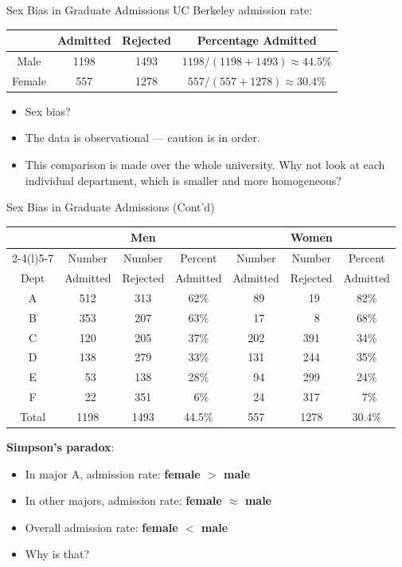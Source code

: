 \documentclass[
  ignorenonframetext,
]{beamer}
\providecommand{\tightlist}{%
  \setlength{\itemsep}{0pt}\setlength{\parskip}{0pt}}
\begin{document}
\begin{frame}{Sex Bias in Graduate Admissions}
\protect\hypertarget{sex-bias-in-graduate-admissions}{}
UC Berkeley admission rate:

\begin{center}
\begin{tabular}{@{}cccc@{}}
& Admitted & Rejected & Percentage Admitted\\\hline
Male   & 1198 & 1493 & $1198/(1198+1493)\approx44.5\%$ \\
Female &  557 & 1278 & $557/(557+1278)\approx30.4\%$\\\hline
\end{tabular}
\end{center}

\begin{itemize}
\tightlist
\item
  Sex bias?
\item
  The data is observational --- caution is in order.
\item
  This comparison is made over the whole university. Why not look at
  each individual department, which is smaller and more homogeneous?
\end{itemize}
\end{frame}

\begin{frame}{Sex Bias in Graduate Admissions (Cont'd)}
\protect\hypertarget{sex-bias-in-graduate-admissions-contd}{}
\begin{center}\small\tabcolsep=3pt
\begin{tabular}{@{}ccccccc@{}}
  & \multicolumn{3}{c}{Men} & \multicolumn{3}{c}{Women} \\\cmidrule(r){2-4}\cmidrule(l){5-7 }
  & Number & Number & Percent & Number & Number & Percent\\
Dept & Admitted & Rejected & Admitted & Admitted & Rejected & Admitted\\\midrule
A & 512& 313& 62\% & ~89 & ~19 & 82\%\\
B & 353& 207& 63\% & ~17 & ~~8 & 68\%\\
C & 120& 205& 37\% & 202 & 391 & 34\%\\
D & 138& 279& 33\% & 131 & 244 & 35\%\\
E & ~53& 138& 28\% & ~94 & 299 & 24\%\\
F & ~22& 351& ~6\% & ~24 & 317 & ~7\%\\\midrule
Total & 1198 & 1493 & 44.5\% & 557 & 1278 & 30.4\%
\end{tabular}
\end{center}

\textbf{Simpson's paradox}:

\begin{itemize}
\tightlist
\item
  In major A, admission rate: \textbf{female $>$ male}
\item
  In other majors, admission rate: \textbf{female $\approx$ male}
\item
  Overall admission rate: \textbf{female $<$ male}
\item
  Why is that?
\end{itemize}
\end{frame}
\end{document}
